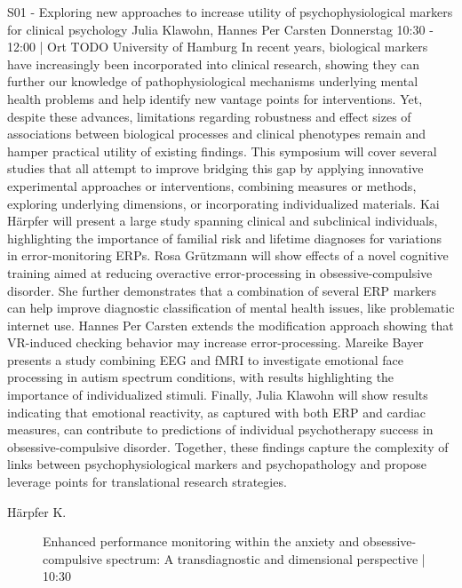 
            \begin{symposium}
            {S01 - Exploring new approaches to increase utility of psychophysiological markers for clinical psychology}
            {Julia Klawohn, Hannes Per Carsten}
            {Donnerstag 10:30 - 12:00 | Ort TODO}
            {University of Hamburg}
            In recent years, biological markers have increasingly been incorporated into clinical research, showing they can further our knowledge of pathophysiological mechanisms underlying mental health problems and help identify new vantage points for interventions. Yet, despite these advances, limitations regarding robustness and effect sizes of associations between biological processes and clinical phenotypes remain and hamper practical utility of existing findings. This symposium will cover several studies that all attempt to improve bridging this gap by applying innovative experimental approaches or interventions, combining measures or methods, exploring underlying dimensions, or incorporating individualized materials. Kai Härpfer will present a large study spanning clinical and subclinical individuals, highlighting the importance of familial risk and lifetime diagnoses for variations in error-monitoring ERPs. Rosa Grützmann will show effects of a novel cognitive training aimed at reducing overactive error-processing in obsessive-compulsive disorder. She further demonstrates that a combination of several ERP markers can help improve diagnostic classification of mental health issues, like problematic internet use. Hannes Per Carsten extends the modification approach showing that VR-induced checking behavior may increase error-processing. Mareike Bayer presents a study combining EEG and fMRI to investigate emotional face processing in autism spectrum conditions, with results highlighting the importance of individualized stimuli. Finally, Julia Klawohn will show results indicating that emotional reactivity, as captured with both ERP and cardiac measures, can contribute to predictions of individual psychotherapy success in obsessive-compulsive disorder. Together, these findings capture the complexity of links between psychophysiological markers and psychopathology and propose leverage points for translational research strategies.
            \begin{description}    
            
                \item [ Härpfer K.] Enhanced performance monitoring within the anxiety and obsessive-compulsive spectrum: A transdiagnostic and dimensional perspective \textcolor{mygray}{ | 10:30}    
                

\end{description}
\end{symposium}
